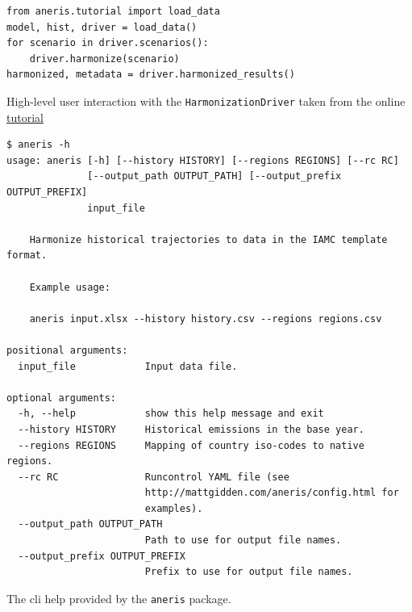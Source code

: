 \documentclass[review]{elsarticle}
\newcommand{\code}[1]{\lstinline[basicstyle=\ttfamily\color{black}]|#1|}
\begin{document}
\begin{listing}[H]
\begin{verbatim}
from aneris.tutorial import load_data
model, hist, driver = load_data()
for scenario in driver.scenarios():
    driver.harmonize(scenario)
harmonized, metadata = driver.harmonized_results()
\end{verbatim}
\caption{High-level user interaction with the \texttt{HarmonizationDriver} taken from the online \href{http://mattgidden.com/aneris/config.html}{tutorial}}
\label{lst:tutorial}
\end{listing}

\begin{listing}[H]
\begin{verbatim}
$ aneris -h
usage: aneris [-h] [--history HISTORY] [--regions REGIONS] [--rc RC]
              [--output_path OUTPUT_PATH] [--output_prefix OUTPUT_PREFIX]
              input_file

    Harmonize historical trajectories to data in the IAMC template format.

    Example usage:

    aneris input.xlsx --history history.csv --regions regions.csv

positional arguments:
  input_file            Input data file.

optional arguments:
  -h, --help            show this help message and exit
  --history HISTORY     Historical emissions in the base year.
  --regions REGIONS     Mapping of country iso-codes to native regions.
  --rc RC               Runcontrol YAML file (see
                        http://mattgidden.com/aneris/config.html for
                        examples).
  --output_path OUTPUT_PATH
                        Path to use for output file names.
  --output_prefix OUTPUT_PREFIX
                        Prefix to use for output file names.
\end{verbatim}
\caption{The \gls{cli} help provided by the \code{aneris} package.}
\label{lst:cli}
\end{listing}
\end{document}
